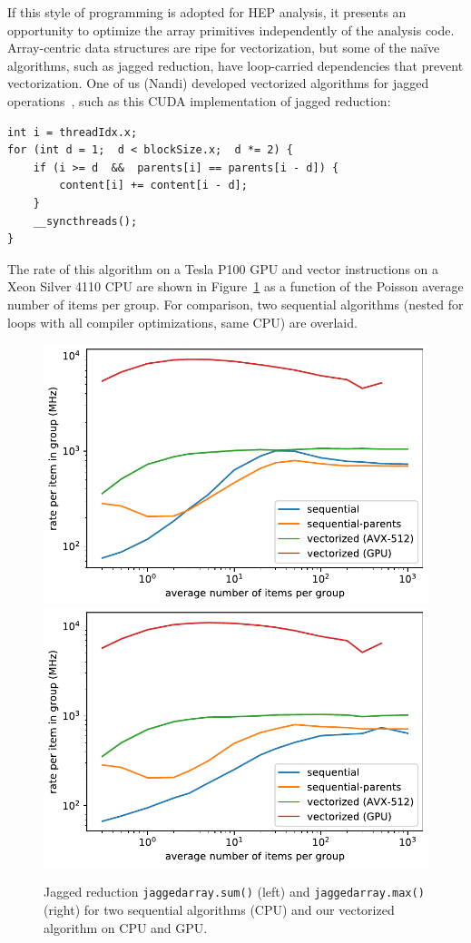 \documentclass{webofc}
\begin{document}
If this style of programming is adopted for HEP analysis, it presents an opportunity to optimize the array primitives independently of the analysis code. Array-centric data structures are ripe for vectorization, but some of the na\"ive algorithms, such as jagged reduction, have loop-carried dependencies that prevent vectorization. One of us (Nandi) developed vectorized algorithms for jagged operations~\cite{jaydeep}, such as this CUDA implementation of jagged reduction:
\begin{center}
\begin{minipage}{0.6\linewidth}
{\small\begin{verbatim}
int i = threadIdx.x;
for (int d = 1;  d < blockSize.x;  d *= 2) {
    if (i >= d  &&  parents[i] == parents[i - d]) {
        content[i] += content[i - d];
    }
    __syncthreads();
}
\end{verbatim}
}
\end{minipage}
\end{center}
\noindent The rate of this algorithm on a Tesla P100 GPU and vector instructions on a Xeon Silver 4110 CPU are shown in Figure~\ref{rates_logy} as a function of the Poisson average number of items per group. For comparison, two sequential algorithms (nested for loops with all compiler optimizations, same CPU) are overlaid.

\begin{figure}
\includegraphics[width=0.5\linewidth]{sum_rates_logy.pdf}\includegraphics[width=0.5\linewidth]{max_rates_logy.pdf}

\caption{Jagged reduction \texttt{jaggedarray.sum()} (left) and \texttt{jaggedarray.max()} (right) for two sequential algorithms (CPU) and our vectorized algorithm on CPU and GPU. \label{rates_logy}}
\end{figure}
\end{document}

